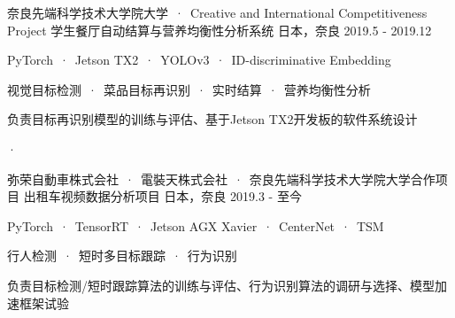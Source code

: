 

\begin{cventries}
  
  \cventryproject 
    {奈良先端科学技术大学院大学\ ·\ Creative and International Competitiveness Project}%
    {学生餐厅自动结算与营养均衡性分析系统} %
    {日本，奈良} %
    {2019.5 - 2019.12} %
    {
      \begin{cvitems} %
        \item {PyTorch\ ·\ Jetson TX2\ ·\ YOLOv3\ ·\ ID-discriminative Embedding}
        \item {视觉目标检测\ ·\ 菜品目标再识别\ ·\ 实时结算\ ·\ 营养均衡性分析}
        \item {负责目标再识别模型的训练与评估、基于Jetson TX2开发板的软件系统设计}
      \end{cvitems}·
    }
    
  \cventryproject 
    {弥荣自動車株式会社\ ·\ 電裝天株式会社\ ·\ 奈良先端科学技术大学院大学\quad 合作项目}%
    {出租车视频数据分析项目} %
    {日本，奈良} %
    {2019.3 - 至今} %
    {
      \begin{cvitems} %
        \item {PyTorch\ ·\ TensorRT\ ·\ Jetson AGX Xavier\ ·\ CenterNet\ ·\ TSM}
        \item {行人检测\ ·\ 短时多目标跟踪\ ·\ 行为识别}
        \item {负责目标检测/短时跟踪算法的训练与评估、行为识别算法的调研与选择、模型加速框架试验}
      \end{cvitems}
    }

\end{cventries}